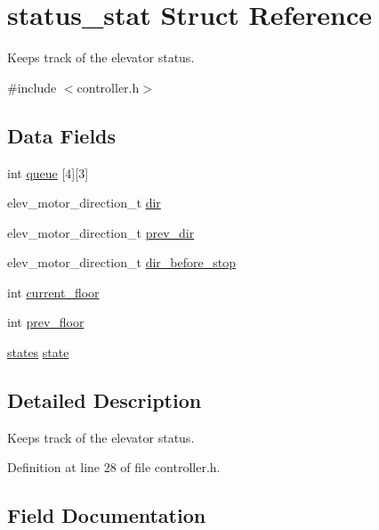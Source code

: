\hypertarget{structstatus__stat}{}\section{status\+\_\+stat Struct Reference}
\label{structstatus__stat}


Keeps track of the elevator status.  




{\ttfamily \#include $<$controller.\+h$>$}

\subsection*{Data Fields}
\begin{DoxyCompactItemize}
\item 
int \hyperlink{structstatus__stat_ad8dbbabdd11cad499360434a98fc4800}{queue} \mbox{[}4\mbox{]}\mbox{[}3\mbox{]}
\item 
elev\+\_\+motor\+\_\+direction\+\_\+t \hyperlink{structstatus__stat_a86473b5ad6efc13580fd36cd74490f8f}{dir}
\item 
elev\+\_\+motor\+\_\+direction\+\_\+t \hyperlink{structstatus__stat_a57dbf007f4cf7b8d0b2872a99f5e6f62}{prev\+\_\+dir}
\item 
elev\+\_\+motor\+\_\+direction\+\_\+t \hyperlink{structstatus__stat_a9edb07751cab0af2679e323190e49762}{dir\+\_\+before\+\_\+stop}
\item 
int \hyperlink{structstatus__stat_afb8f4c42e97ba9ede62ba17a2f157757}{current\+\_\+floor}
\item 
int \hyperlink{structstatus__stat_a4ccf00bc4cb3475a93c3bf5eb2a9a819}{prev\+\_\+floor}
\item 
\hyperlink{controller_8h_ada5afb1226f3d604e014674fa0448069}{states} \hyperlink{structstatus__stat_ac485f83fea98239454b3ec1eb49e29cc}{state}
\end{DoxyCompactItemize}


\subsection{Detailed Description}
Keeps track of the elevator status. 

Definition at line 28 of file controller.\+h.



\subsection{Field Documentation}
